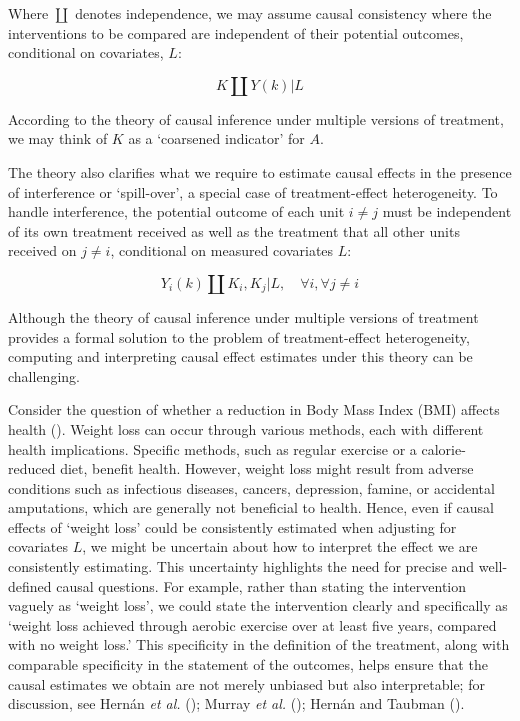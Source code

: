 \documentclass[
  single column]{article}
\begin{document}
Where \(\coprod\) denotes independence, we may assume causal consistency
where the interventions to be compared are independent of their
potential outcomes, conditional on covariates, \(L\):

\[
K \coprod Y(k) | L
\]

According to the theory of causal inference under multiple versions of
treatment, we may think of \(K\) as a `coarsened indicator' for \(A\).

The theory also clarifies what we require to estimate causal effects in
the presence of interference or `spill-over', a special case of
treatment-effect heterogeneity. To handle interference, the potential
outcome of each unit \(i \neq j\) must be independent of its own
treatment received as well as the treatment that all other units
received on \(j \neq i\), conditional on measured covariates \(L\):

\[
Y_i(k) \coprod K_i, K_j | L, \quad \forall i, \forall j \neq i
\]

Although the theory of causal inference under multiple versions of
treatment provides a formal solution to the problem of treatment-effect
heterogeneity, computing and interpreting causal effect estimates under
this theory can be challenging.

Consider the question of whether a reduction in Body Mass Index (BMI)
affects health ().
Weight loss can occur through various methods, each with different
health implications. Specific methods, such as regular exercise or a
calorie-reduced diet, benefit health. However, weight loss might result
from adverse conditions such as infectious diseases, cancers,
depression, famine, or accidental amputations, which are generally not
beneficial to health. Hence, even if causal effects of `weight loss'
could be consistently estimated when adjusting for covariates \(L\), we
might be uncertain about how to interpret the effect we are consistently
estimating. This uncertainty highlights the need for precise and
well-defined causal questions. For example, rather than stating the
intervention vaguely as `weight loss', we could state the intervention
clearly and specifically as `weight loss achieved through aerobic
exercise over at least five years, compared with no weight loss.' This
specificity in the definition of the treatment, along with comparable
specificity in the statement of the outcomes, helps ensure that the
causal estimates we obtain are not merely unbiased but also
interpretable; for discussion, see Hernán \emph{et al.}
(); Murray \emph{et al.}
(); Hernán and Taubman
().
\end{document}
